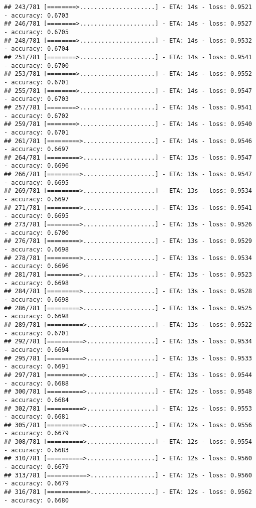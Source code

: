 \documentclass[
]{article}
\begin{document}
\begin{verbatim}
## 243/781 [========>.....................] - ETA: 14s - loss: 0.9521 - accuracy: 0.6703
## 246/781 [========>.....................] - ETA: 14s - loss: 0.9527 - accuracy: 0.6705
## 248/781 [========>.....................] - ETA: 14s - loss: 0.9532 - accuracy: 0.6704
## 251/781 [========>.....................] - ETA: 14s - loss: 0.9541 - accuracy: 0.6700
## 253/781 [========>.....................] - ETA: 14s - loss: 0.9552 - accuracy: 0.6701
## 255/781 [========>.....................] - ETA: 14s - loss: 0.9547 - accuracy: 0.6703
## 257/781 [========>.....................] - ETA: 14s - loss: 0.9541 - accuracy: 0.6702
## 259/781 [========>.....................] - ETA: 14s - loss: 0.9540 - accuracy: 0.6701
## 261/781 [=========>....................] - ETA: 14s - loss: 0.9546 - accuracy: 0.6697
## 264/781 [=========>....................] - ETA: 13s - loss: 0.9547 - accuracy: 0.6696
## 266/781 [=========>....................] - ETA: 13s - loss: 0.9547 - accuracy: 0.6695
## 269/781 [=========>....................] - ETA: 13s - loss: 0.9534 - accuracy: 0.6697
## 271/781 [=========>....................] - ETA: 13s - loss: 0.9541 - accuracy: 0.6695
## 273/781 [=========>....................] - ETA: 13s - loss: 0.9526 - accuracy: 0.6700
## 276/781 [=========>....................] - ETA: 13s - loss: 0.9529 - accuracy: 0.6698
## 278/781 [=========>....................] - ETA: 13s - loss: 0.9534 - accuracy: 0.6696
## 281/781 [=========>....................] - ETA: 13s - loss: 0.9523 - accuracy: 0.6698
## 284/781 [=========>....................] - ETA: 13s - loss: 0.9528 - accuracy: 0.6698
## 286/781 [=========>....................] - ETA: 13s - loss: 0.9525 - accuracy: 0.6698
## 289/781 [==========>...................] - ETA: 13s - loss: 0.9522 - accuracy: 0.6701
## 292/781 [==========>...................] - ETA: 13s - loss: 0.9534 - accuracy: 0.6694
## 295/781 [==========>...................] - ETA: 13s - loss: 0.9533 - accuracy: 0.6691
## 297/781 [==========>...................] - ETA: 13s - loss: 0.9544 - accuracy: 0.6688
## 300/781 [==========>...................] - ETA: 12s - loss: 0.9548 - accuracy: 0.6684
## 302/781 [==========>...................] - ETA: 12s - loss: 0.9553 - accuracy: 0.6681
## 305/781 [==========>...................] - ETA: 12s - loss: 0.9556 - accuracy: 0.6679
## 308/781 [==========>...................] - ETA: 12s - loss: 0.9554 - accuracy: 0.6683
## 310/781 [==========>...................] - ETA: 12s - loss: 0.9560 - accuracy: 0.6679
## 313/781 [===========>..................] - ETA: 12s - loss: 0.9560 - accuracy: 0.6679
## 316/781 [===========>..................] - ETA: 12s - loss: 0.9562 - accuracy: 0.6680

\end{verbatim}
\end{document}
